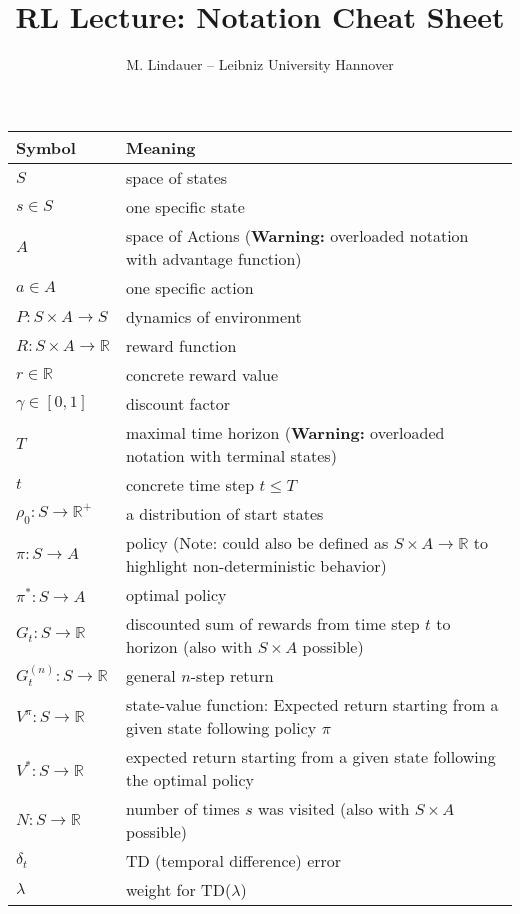 \documentclass[]{article}
\title{RL Lecture: Notation Cheat Sheet}
\author{M. Lindauer -- Leibniz University Hannover}
\date{}
\begin{document}
\maketitle

\begin{table}[h]
	\centering
	\begin{tabular}{ll}
		\toprule
		\textbf{Symbol} & \textbf{Meaning} \\
		\midrule
		$S$	   & space of states\\
		$s \in S$	   & one specific state\\
		$A$    & space of Actions (\textbf{Warning:} overloaded notation with advantage function)\\
		$a \in A$    & one specific action\\
		$P: S \times A \to S$	   & dynamics of environment \\
		$R: S \times A \to \mathbb{R}$	   & reward function\\
		$r \in \mathbb{R}$ & concrete reward value\\
		$\gamma \in [0,1]$  & discount factor\\
		$T$	   & maximal time horizon (\textbf{Warning:} overloaded notation with terminal states)\\
		$t$	   & concrete time step $t \leq T$\\
		$\rho_0: S \to \mathbb{R}^+$ & a distribution of start states\\
		$\pi: S \to A$ & policy (Note: could also be defined as $S \times A \to \mathbb{R}$ to highlight non-deterministic behavior)\\
		$\pi^*: S \to A$ & optimal policy\\
		$G_t: S \to \mathbb{R} $ & discounted sum of rewards from time step $t$ to horizon (also with $S \times A$ possible)\\
		$G_t^{(n)}: S \to \mathbb{R} $ & general $n$-step return\\
		$V^\pi: S \to \mathbb{R}$ & state-value function: Expected return starting from a given state following policy $\pi$\\
		$V^* : S \to \mathbb{R}$ & expected return starting from a given state following the optimal policy\\
		$N: S \to \mathbb{R}$ & number of times $s$ was visited (also with $S \times A$ possible)\\
		$\delta_t$ & TD (temporal difference) error \\
		$\lambda$ & weight for TD($\lambda$)\\

\end{tabular}
\end{table}
\end{document}
